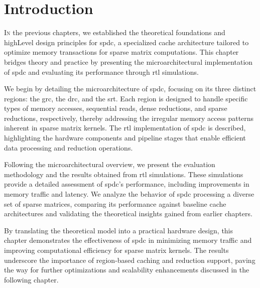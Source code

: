 
\section{Introduction}
\label{sec:arch:intro}

\lettrine{I}{n} the previous chapters, we established the theoretical foundations and \gls{highLevel} design principles for \acrlong{spdc}, a specialized cache architecture tailored to optimize memory transactions for sparse matrix computations.
This chapter bridges theory and practice by presenting the microarchitectural implementation of \acrlong{spdc} and evaluating its performance through \acrfull{rtl} simulations.

We begin by detailing the microarchitecture of \acrlong{spdc}, focusing on its three distinct regions: the \acrfull{grc}, the \acrfull{drc}, and the \acrfull{srt}.
Each region is designed to handle specific types of memory accesses, sequential reads, dense \glspl{reduction}, and sparse \glspl{reduction}, respectively, thereby addressing the irregular memory access patterns inherent in sparse matrix kernels.
The \acrshort{rtl} implementation of \acrlong{spdc} is described, highlighting the hardware components and \gls{pipeline} stages that enable efficient data processing and \gls{reduction} operations.

Following the microarchitectural overview, we present the evaluation methodology and the results obtained from \acrshort{rtl} simulations.
These simulations provide a detailed assessment of \acrlong{spdc}'s performance, including improvements in memory traffic and latency.
We analyze the behavior of \acrlong{spdc} processing a diverse set of sparse matrices, comparing its performance against baseline cache architectures and validating the theoretical insights gained from earlier chapters.

By translating the theoretical model into a practical hardware design, this chapter demonstrates the effectiveness of \acrlong{spdc} in minimizing memory traffic and improving computational efficiency for sparse matrix kernels.
The results underscore the importance of region-based caching and \gls{reduction} support, paving the way for further optimizations and scalability enhancements discussed in the following chapter.